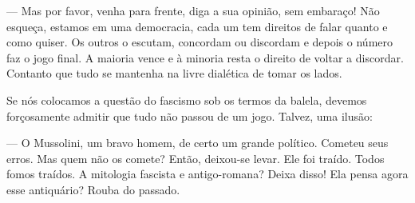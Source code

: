 --- Mas por favor, venha para frente, diga a sua opinião, sem embaraço!
Não esqueça, estamos em uma democracia, cada um tem direitos de falar
quanto e como quiser. Os outros o escutam, concordam ou discordam e
depois o número faz o jogo final. A maioria vence e à minoria resta o
direito de voltar a discordar. Contanto que tudo se mantenha na livre
dialética de tomar os lados.

Se nós colocamos a questão do fascismo sob os termos da balela, devemos
forçosamente admitir que tudo não passou de um jogo. Talvez, uma ilusão:

--- O Mussolini, um bravo homem, de certo um grande político. Cometeu
seus erros. Mas quem não os comete? Então, deixou-se levar. Ele foi
traído. Todos fomos traídos. A mitologia fascista e antigo-romana? Deixa
disso! Ela pensa agora esse antiquário? Rouba do passado.

